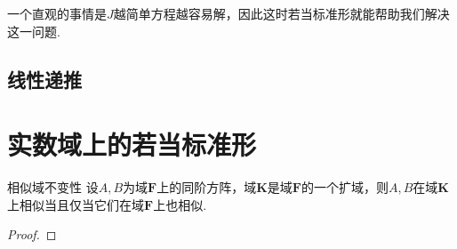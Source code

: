 一个直观的事情是$J$越简单方程越容易解，因此这时若当标准形就能帮助我们解决这一问题.

\subsection{线性递推}


\section{实数域上的若当标准形} \label{sec:实数域上的若当标准形}

\begin{theorem}{}{相似域不变性}
    设$A,B$为域$\mathbf{F}$上的同阶方阵，域$\mathbf{K}$是域$\mathbf{F}$的一个扩域，则$A,B$在域$\mathbf{K}$上相似当且仅当它们在域$\mathbf{F}$上也相似.
\end{theorem}
\begin{proof}

\end{proof}

